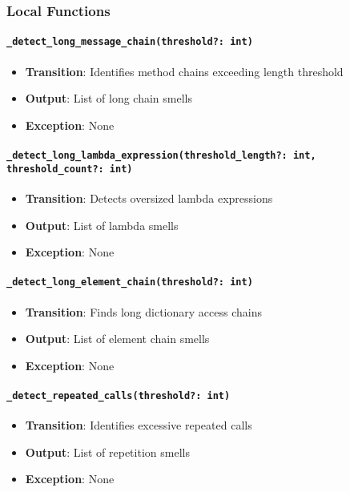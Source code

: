 \documentclass[12pt, titlepage]{article}
\begin{document}
\subsubsection{Local Functions}

\paragraph{\texttt{\_detect\_long\_message\_chain(threshold?: int)}}
\begin{itemize}
  \item \textbf{Transition}: Identifies method chains exceeding length threshold
  \item \textbf{Output}: List of long chain smells
  \item \textbf{Exception}: None
\end{itemize}

\paragraph{\texttt{\_detect\_long\_lambda\_expression(threshold\_length?: int, threshold\_count?: int)}}
\begin{itemize}
  \item \textbf{Transition}: Detects oversized lambda expressions
  \item \textbf{Output}: List of lambda smells
  \item \textbf{Exception}: None
\end{itemize}

\paragraph{\texttt{\_detect\_long\_element\_chain(threshold?: int)}}
\begin{itemize}
  \item \textbf{Transition}: Finds long dictionary access chains
  \item \textbf{Output}: List of element chain smells
  \item \textbf{Exception}: None
\end{itemize}

\paragraph{\texttt{\_detect\_repeated\_calls(threshold?: int)}}
\begin{itemize}
  \item \textbf{Transition}: Identifies excessive repeated calls
  \item \textbf{Output}: List of repetition smells
  \item \textbf{Exception}: None
\end{itemize}
\end{document}
